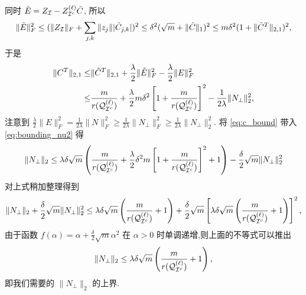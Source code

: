 同时 \(\tilde{E} = Z_{\mathcal{I}} - Z_{\mathcal{I}^c}^{(\ell)}\tilde{C}\), 所以 
\[\|\tilde{E}\|_F^2 \leq (\|Z_{\mathcal{I}}\|_F+\sum_{j,k} \|z_j\||\tilde{C}_{j,k}|)^2
\leq \delta^2 (\sqrt{m} + \|\tilde{C}\|_1)^2\leq m \delta^2(1+ \|\tilde{C}^T\|_{2,1})^2,\]
于是
\begin{align}
  \|C^T\|_{2,1} \leq& \|\tilde{C}^T\|_{2,1} +
  \frac{\lambda}{2}\|\tilde{E}\|_F^2-\frac{\lambda}{2}\|E\|_F^2\nonumber \\
  \leq& \frac{m}{r{(\mathcal{Q}_{\mathcal{I}^c}^{(\ell)})}}+\frac{\lambda}{2}m\delta^2
  \left[1+\frac{m}{r{(\mathcal{Q}_{\mathcal{I}^c}^{(\ell)})}}\right]^2-\frac{1}{2\lambda}\|N_{\perp}\|_2^2,
  \label{eq:c_bound}
\end{align}
注意到 \(\frac{\lambda}{2}\|E\|_F^2=\frac{1}{2\lambda}\|N\|_F^2
\geq\frac{1}{2\lambda}\|N_{\perp}\|_F^2 \geq\frac{1}{2\lambda}\|N_{\perp}\|_2^2\).
将 \eqref{eq:c_bound} 带入 \eqref{eq:bounding_nu2} 得
\[\|N_{\perp}\|_2 \leq \lambda \delta \sqrt{m} 
\left(\frac{m}{r(\mathcal{Q}_{\mathcal{I}^c}^{(\ell)})}+\frac{\lambda}{2}\delta^2m
\left[1+\frac{m}{r(\mathcal{Q}_{\mathcal{I}^c}^{(\ell)})}\right]^2+1\right)
-\frac{\delta}{2}\sqrt{m}\|N_{\perp}\|_2^2 \]
对上式稍加整理得到
\[\|N_{\perp}\|_2+\frac{\delta}{2}\sqrt{m}\|N_{\perp}\|_2^2\leq
  \lambda\delta\sqrt{m}\left(\frac{m}{r(\mathcal{Q}_{\mathcal{I}^c}^{(\ell)})}+1\right)+
  \frac{\delta}{2}\sqrt{m} \left[\lambda\delta\sqrt{m}
  \left(\frac{m}{r(\mathcal{Q}_{\mathcal{I}^c}^{(\ell)})}+1\right)\right]^2,\]
由于函数 \(f(\alpha)=\alpha+\frac{\delta}{2}\sqrt{m}\alpha^2\) 在 \(\alpha>0\)
时单调递增,则上面的不等式可以推出
\begin{equation}\label{eq:nu2_bound}
  \|N_{\perp}\|_2 \leq \lambda\delta\sqrt{m}\left(\frac{m}{r(\mathcal{Q}_{\mathcal{I}^c}^{(\ell)})}+1\right),
\end{equation}
即我们需要的 \(\|N_{\perp}\|_2\) 的上界.


